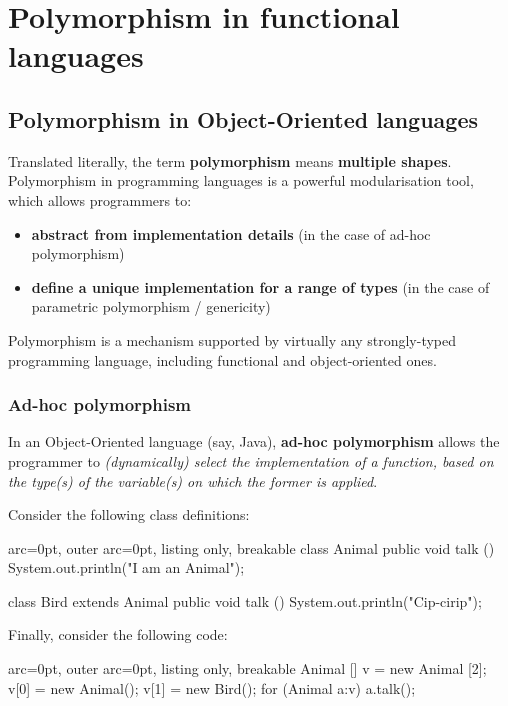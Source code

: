 \section*{ Polymorphism in functional languages }

\subsection*{ Polymorphism in Object-Oriented languages }

Translated literally, the term \textbf{polymorphism} means \textbf{multiple shapes}. Polymorphism in programming languages is a powerful modularisation tool, which allows programmers to:
\begin{itemize}
	\item  \textbf{abstract from implementation details} (in the case of ad-hoc polymorphism)
	\item  \textbf{define a unique implementation for a range of types} (in the case of parametric polymorphism / genericity)
\end{itemize}

Polymorphism is a mechanism supported by virtually any strongly-typed programming language, including functional and object-oriented ones.

\subsubsection*{ Ad-hoc polymorphism }

In an Object-Oriented language (say, Java), \textbf{ad-hoc polymorphism} allows the programmer to \textit{(dynamically) select the implementation of a function, based on the type(s) of the variable(s) on which the former is applied}.

Consider the following class definitions:

\begin{tcblisting}{ arc=0pt, outer arc=0pt, listing only, breakable}
class Animal {
  public void talk (){
    System.out.println("I am an Animal");
  }
}

class Bird extends Animal {
  public void talk (){
    System.out.println("Cip-cirip");
  }
}

\end{tcblisting}


Finally, consider the following code:

\begin{tcblisting}{ arc=0pt, outer arc=0pt, listing only, breakable}
 Animal [] v = new Animal [2];
    v[0] = new Animal();
    v[1] = new Bird();
    for (Animal a:v)
      a.talk();

\end{tcblisting}


